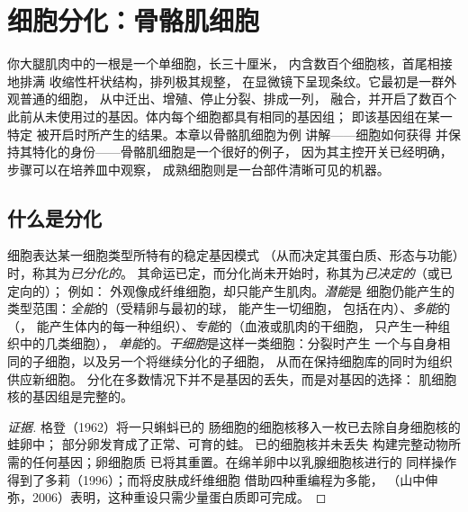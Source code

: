 \chapter{细胞分化：骨骼肌细胞}\label{ch:b2:cell-differentiation}

你大腿肌肉中的一根是一个单细胞，长三十厘米，
内含数百个细胞核，首尾相接地排满
收缩性杆状结构，排列极其规整，
在显微镜下呈现条纹。它最初是一群外观普通的细胞，
从中迁出、增殖、停止分裂、排成一列，
融合，并开启了数百个
此前从未使用过的基因。体内每个细胞都具有相同的基因组；
即该基因组在某一特定
被开启时所产生的结果。本章以骨骼肌细胞为例
讲解\emph{}——细胞如何获得
并保持其特化的身份——骨骼肌细胞是一个很好的例子，
因为其主控开关已经明确，步骤可以在培养皿中观察，
成熟细胞则是一台部件清晰可见的机器。

\section{什么是分化}

\begin{definition}[分化、决定、潜能]\label{def:b2:cell-differentiation:differentiation}
细胞表达某一细胞类型所特有的稳定基因模式
（从而决定其蛋白质、形态与功能）时，称其为\emph{已分化的}。
其命运已定，而分化尚未开始时，称其为\emph{已决定的}（或已定向的）；
例如：
外观像成纤维细胞，却只能产生肌肉。\emph{潜能}是
细胞仍能产生的类型范围：\emph{全能}的（受精卵与最初的球，
能产生一切细胞，
包括在内）、\emph{多能}的（，
能产生体内的每一种组织）、\emph{专能}的（血液或肌肉的干细胞，
只产生一种组织中的几类细胞），
\emph{单能}的。\emph{干细胞}是这样一类细胞：分裂时产生
一个与自身相同的子细胞，以及另一个将继续分化的子细胞，
从而在保持细胞库的同时为组织供应新细胞。
分化在多数情况下并不是基因的丢失，而是对基因的选择：
肌细胞核的基因组是完整的。
\end{definition}
\begin{proof}[证据]
格登（1962）将一只蝌蚪已的
肠细胞的细胞核移入一枚已去除自身细胞核的蛙卵中；
部分卵发育成了正常、可育的蛙。
已的细胞核并未丢失
构建完整动物所需的任何基因；卵细胞质
已将其重置。在绵羊卵中以乳腺细胞核进行的
同样操作得到了多莉（1996）；而将皮肤成纤维细胞
借助四种重编程为多能，
（山中伸弥，2006）表明，这种重设只需少量蛋白质即可完成。
\end{proof}

